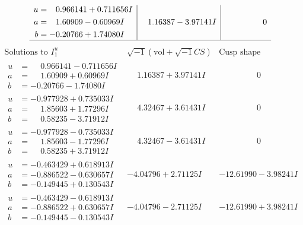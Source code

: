 \documentclass[1p]{elsarticle_modified}
\theoremstyle{definition}
\newcommand{\I}{\sqrt{-1}}
\begin{document}
$$\begin{array}{c|c|c}
\begin{aligned}
u &= \phantom{-}0.966141 + 0.711656 I \\
a &= \phantom{-}1.60909 - 0.60969 I \\
b &= -0.20766 + 1.74080 I\end{aligned}
 & \phantom{-}1.16387 - 3.97141 I & \phantom{-0.000000 } 0\\
 \hline 
 \end{array}$$\newpage$$\begin{array}{c|c|c}  
\text{Solutions to }I^u_{1}& \I (\text{vol} + \sqrt{-1}CS) & \text{Cusp shape}\\
 \hline 
\begin{aligned}
u &= \phantom{-}0.966141 - 0.711656 I \\
a &= \phantom{-}1.60909 + 0.60969 I \\
b &= -0.20766 - 1.74080 I\end{aligned}
 & \phantom{-}1.16387 + 3.97141 I & \phantom{-0.000000 } 0 \\ \hline\begin{aligned}
u &= -0.977928 + 0.735033 I \\
a &= \phantom{-}1.85603 + 1.77296 I \\
b &= \phantom{-}0.58235 - 3.71912 I\end{aligned}
 & \phantom{-}4.32467 + 3.61431 I & \phantom{-0.000000 } 0 \\ \hline\begin{aligned}
u &= -0.977928 - 0.735033 I \\
a &= \phantom{-}1.85603 - 1.77296 I \\
b &= \phantom{-}0.58235 + 3.71912 I\end{aligned}
 & \phantom{-}4.32467 - 3.61431 I & \phantom{-0.000000 } 0 \\ \hline\begin{aligned}
u &= -0.463429 + 0.618913 I \\
a &= -0.886522 - 0.630657 I \\
b &= -0.149445 + 0.130543 I\end{aligned}
 & -4.04796 + 2.71125 I & -12.61990 - 3.98241 I \\ \hline\begin{aligned}
u &= -0.463429 - 0.618913 I \\
a &= -0.886522 + 0.630657 I \\
b &= -0.149445 - 0.130543 I\end{aligned}
 & -4.04796 - 2.71125 I & -12.61990 + 3.98241 I \\ \hline\begin{aligned}

\end{aligned}
\end{array}$$
\end{document}
